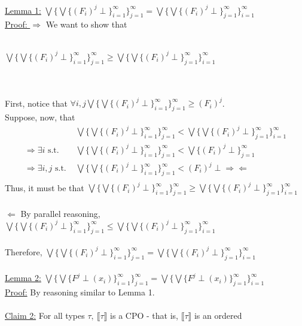 \documentclass{westhesis}
\begin{document}
 \underline{Lemma 1:} $\bigvee\{\bigvee\{(F_i)^j \perp\}^{\infty}_{i=1}\}^{\infty}_{j=1}= \bigvee\{\bigvee\{(F_i)^j \perp\}^{\infty}
 _{j=1}\}^{\infty}_{i=1}$\\
 \underline{Proof: } $\Rightarrow$ We want to show that\\ \\ \centerline{$\bigvee\{\bigvee\{(F_i)^j \perp\}^{\infty}_{i=1}\}^{\infty}
 _{j=1} \geq  \bigvee\{\bigvee\{(F_i)^j \perp\}^{\infty}_{j=1}\}^{\infty}_{i=1}$} \\ \\ First, notice that $\forall i, j \bigvee\{\bigvee
 \{(F_i)^j \perp\}^{\infty}_{i=1}\}^{\infty}_{j=1} \geq (F_i)^j$. \\
 Suppose, now, that 
 \begin{align*}
 &\bigvee\{\bigvee\{(F_i)^j \perp\}^{\infty}_{i=1}\}^{\infty}_{j=1} < \bigvee\{\bigvee\{(F_i)^j \perp\}^{\infty}_{j=1}\}^{\infty}_{i=1}\\ 
 \Rightarrow \exists i \text{ s.t. \ \  \ } &\bigvee\{\bigvee\{(F_i)^j \perp\}^{\infty}_{i=1}\}^{\infty}_{j=1} < \bigvee\{(F_i)^j \perp\}
 ^{\infty}_{j=1}\\
 \Rightarrow \exists i, j \text{ s.t. } &\bigvee\{\bigvee\{(F_i)^j \perp\}^{\infty}_{i=1}\}^{\infty}_{j=1} < (F_i)^j \perp 
 \Rightarrow\Leftarrow\\
 \end{align*}
 Thus, it must be that $\bigvee\{\bigvee\{(F_i)^j \perp\}^{\infty}_{i=1}\}^{\infty}_{j=1} \geq  \bigvee\{\bigvee\{(F_i)^j \perp\}^{\infty}
 _{j=1}\}^{\infty}_{i=1}$ \\ \\
 $\Leftarrow$ By parallel reasoning, $\bigvee\{\bigvee\{(F_i)^j \perp\}^{\infty}_{i=1}\}^{\infty}_{j=1} \leq  \bigvee\{\bigvee\{(F_i)^j 
 \perp\}^{\infty}_{j=1}\}^{\infty}_{i=1}$ \\ \\
 Therefore, $\bigvee\{\bigvee\{(F_i)^j \perp\}^{\infty}_{i=1}\}^{\infty}_{j=1} = \bigvee\{\bigvee\{(F_i)^j \perp\}^{\infty}_{j=1}\}
 ^{\infty}_{i=1}$ \\ \\
 \underline{Lemma 2:} $\bigvee\{\bigvee\{F^j \perp(x_i)\}^{\infty}_{i=1}\}^{\infty}_{j=1} = \bigvee\{\bigvee\{F^j \perp(x_i)\}^{\infty}
 _{j=1}\}^{\infty}_{i=1}$\\ 
 \underline{Proof:} By reasoning similar to Lemma 1. \\ \\
\underline{Claim 2:} For all types $\tau, \ \llbracket \tau \rrbracket$ is a CPO - that is, $\llbracket \tau \rrbracket$ is an ordered 
\end{document}
